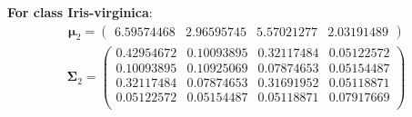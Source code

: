 \documentclass[11pt,a4paper]{article}
\newcommand{\bs}[1]{\boldsymbol{#1}}
\begin{document}
\textbf{For class Iris-virginica}:
\begin{align} \bs{\mu}_{2} = \begin{pmatrix} 
6.59574468 & 2.96595745 & 5.57021277 & 2.03191489 
 \end{pmatrix}  \end{align} 
\vspace{-1cm}
\begin{align} \bs{\Sigma}_{2} = \begin{pmatrix} 
0.42954672 & 0.10093895 & 0.32117484 & 0.05122572 \\ 
0.10093895 & 0.10925069 & 0.07874653 & 0.05154487 \\ 
0.32117484 & 0.07874653 & 0.31691952 & 0.05118871 \\ 
0.05122572 & 0.05154487 & 0.05118871 & 0.07917669 \\ 
\end{pmatrix} \end{align}

\newpage

\hypertarget{EM}{}
\end{document}

